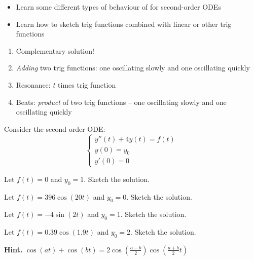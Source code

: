 \begin{annotation}
\begin{goals}
	\begin{itemize}
		\item Learn some different types of behaviour of for second-order ODEs
		\item Learn how to sketch trig functions combined with linear or other trig functions
	\end{itemize}
	
	\hfill
	
	\begin{enumerate}[label=.\arabic*.]
		\item Complementary solution!
		\item \emph{Adding} two trig functions: one oscillating slowly and one oscillating quickly
		\item Resonance: $t$ times trig function
		\item Beats: \emph{product} of two trig functions -- one oscillating slowly and one oscillating quickly
	\end{enumerate}
\end{goals}	
\end{annotation}
\question \label{2nd:analysis:ode2}
	Consider the second-order ODE:
	$$
	\begin{cases}
	y''(t) +4 y(t) = f(t) \\
	y(0)=y_0\\
	y'(0)=0
	\end{cases}
	$$
	
	\begin{parts}
		\item Let $f(t)=0$ and $y_0=1$. Sketch the solution.
		\item Let $f(t)= 396\cos(20t)$ and $y_0=0$. Sketch the solution.

		\item Let $f(t) = -4\sin(2t)$ and $y_0=1$. Sketch the solution.

		\item Let $f(t) = 0.39\cos(1.9t)$ and $y_0=2$. Sketch the solution.
		
		\textbf{Hint. } $\displaystyle \cos(at) + \cos(bt) = 2 \cos\left( \frac{a-b}{2} \right)  \cos\left(\frac{a+b}{2} t \right)$
	\end{parts}



\standardonlynewpage
